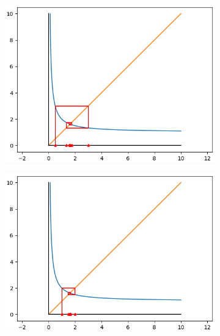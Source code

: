 \documentclass[11pt]{report}
\begin{document}
\begin{solution}
\begin{enumerate}
        \begin{figure}[H]
            \centering
            \begin{subfigure}[b]{0.49\textwidth}
            \centering
            \includegraphics[scale = 0.5]{./img/Figure_7.png}
            \end{subfigure}
            \begin{subfigure}[b]{0.49\textwidth}
            \centering
            \includegraphics[scale = 0.5]{./img/Figure_8.png}
            \end{subfigure}

            \vspace{\baselineskip}
            

\end{figure}
\end{enumerate}
\end{solution}
\end{document}
